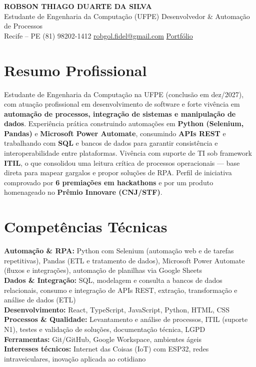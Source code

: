 \documentclass[a4paper,10.5pt]{article}
\newcommand{\skillline}[2]{\textbf{#1:} #2\\}
\begin{document}
\begin{center}
  {\LARGE\bfseries\color{primary} ROBSON THIAGO DUARTE DA SILVA}\\[3pt]
  {\large Estudante de Engenharia da Computação (UFPE) \textbar{} Desenvolvedor \& Automação de Processos}\\[5pt]
  \small
  Recife -- PE \textbar{}
  (81) 98202-1412 \textbar{}
  \href{mailto:robgol.fidel@gmail.com}{robgol.fidel@gmail.com} \textbar{}
  \href{https://sites.google.com/cin.ufpe.br/rtds/p\%C3\%A1gina-inicial}{Portfólio}
\end{center}

\vspace{-0.3em}

\section{Resumo Profissional}
Estudante de Engenharia da Computação na UFPE (conclusão em dez/2027), com atuação profissional em desenvolvimento
de software e forte vivência em \textbf{automação de processos, integração de sistemas e manipulação de dados}.
Experiência prática construindo automações em \textbf{Python (Selenium, Pandas)} e \textbf{Microsoft Power Automate},
consumindo \textbf{APIs REST} e trabalhando com \textbf{SQL} e bancos de dados para garantir consistência e
interoperabilidade entre plataformas. Vivência com suporte de TI sob framework \textbf{ITIL}, o que consolidou uma
leitura crítica de processos operacionais --- base direta para mapear gargalos e propor soluções de RPA.
Perfil de iniciativa comprovado por \textbf{6 premiações em hackathons} e por um produto homenageado no
\textbf{Prêmio Innovare (CNJ/STF)}.

\section{Competências Técnicas}
\skillline{Automação \& RPA}{Python com Selenium (automação web e de tarefas repetitivas), Pandas (ETL e tratamento de dados), Microsoft Power Automate (fluxos e integrações), automação de planilhas via Google Sheets}
\skillline{Dados \& Integração}{SQL, modelagem e consulta a bancos de dados relacionais, consumo e integração de APIs REST, extração, transformação e análise de dados (ETL)}
\skillline{Desenvolvimento}{React, TypeScript, JavaScript, Python, HTML, CSS}
\skillline{Processos \& Qualidade}{Levantamento e análise de processos, ITIL (suporte N1), testes e validação de soluções, documentação técnica, LGPD}
\skillline{Ferramentas}{Git/GitHub, Google Workspace, ambientes ágeis}
\skillline{Interesses técnicos}{Internet das Coisas (IoT) com ESP32, redes intraveiculares, inovação aplicada ao cotidiano}
\end{document}

